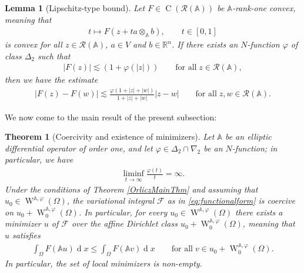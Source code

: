 \documentclass[a4paper,11pt]{amsart}
\numberwithin{equation}{section}
\newcommand{\R}{\mathbb{R}}
\newcommand{\dif}{\operatorname{d}\!}
\newcommand{\sobo}{\operatorname{W}}
\newcommand{\hold}{\operatorname{C}}
\newtheorem{lemma}[defi]{Lemma}
\newtheorem{satz}[defi]{Theorem}
\begin{document}
	\begin{lemma}[Lipschitz-type bound]\label{lem:Lipbound}
		Let $F\in\hold(\mathscr{R}(\mathbb{A}))$ be \emph{$\mathbb{A}$-rank-one convex,} meaning that 
		\begin{align*}
			t\mapsto F(z+ta\otimes_{\mathbb{A}}b),\qquad t\in[0,1] 
		\end{align*}
		is convex for all $z\in\mathscr{R}(\mathbb{A})$, $a\in V$ and $b\in\R^{n}$. If there exists an $N$-function $\varphi$ of class $\Delta_{2}$ such that 
		\begin{align*}
			|F(z)|\lesssim(1+\varphi(|z|))\qquad \text{for all}\; z\in\mathscr{R}(\mathbb{A}), 
		\end{align*}
		then we have the estimate 
		\begin{align*}
			|F(z)-F(w)| \lesssim \frac{\varphi(1+|z|+|w|)}{1+|z|+|w|}|z-w|\qquad\text{for all}\;z,w\in\mathscr{R}(\mathbb{A}). 
		\end{align*}
	\end{lemma}
	We now come to the main result of the present subsection:
	\begin{satz}[Coercivity and existence of minimizers] \label{lem:exis}
		Let $\mathbb{A}$ be an elliptic differential operator of order one, and let $\varphi\in\Delta_{2} \cap \nabla_2$ be an $N$-function; in particular, we have  \begin{align}\label{eq:lowerboundsuperlinear}
			\liminf_{t\to\infty}\frac{\varphi(t)}{t} = \infty.  
		\end{align}
		Under the conditions of Theorem \ref{OrliczMainThm} and assuming that $u_{0}\in\sobo^{\mathbb{A},\varphi}(\Omega)$, the variational integral $\mathcal{F}$ as in \eqref{eq:functionalform} is \emph{coercive} on $u_{0}+\sobo_{0}^{\mathbb{A},\varphi}(\Omega)$. In particular, for every $u_0 \in \sobo^{\mathbb{A},\varphi}(\Omega)$ there exists a minimizer $u$ of $\mathcal{F}$ over the affine Dirichlet class $u_0 + \sobo_0^{\mathbb{A}, \varphi}(\Omega)$, meaning that $u$ satisfies 
		\begin{align}\label{eq:minmain}
			\int_{\Omega}F(\mathbb{A}u)\dif x \leq \int_{\Omega}F(\mathbb{A}v)\dif x\qquad\text{for all}\;v\in u_{0}+\sobo_{0}^{\mathbb{A},\varphi}(\Omega).
		\end{align}
		In particular, the set of local minimizers is non-empty.
	\end{satz}
\end{document}

